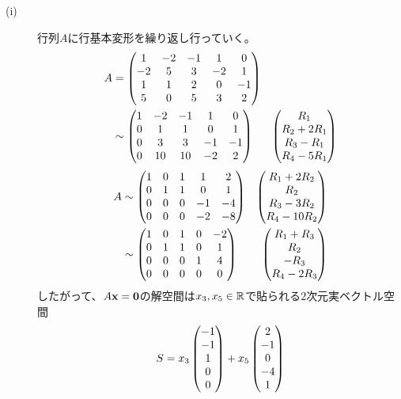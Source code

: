 \begin{sol} ${}$
  \begin{description}
    \item[(i)] 行列$A$に行基本変形を繰り返し行っていく。
    \begin{align*}
      A &= \begin{pmatrix} 
      1 & -2 & -1 & 1 & 0 \\
      -2 & 5 & 3 & -2 & 1 \\
      1& 1& 2 &0 &-1 \\
      5&  0&  5&  3&  2 \\
       \end{pmatrix} \\
      &\sim \begin{pmatrix} 
      1 & -2 & -1 & 1 & 0 \\
      0 & 1 & 1 & 0 & 1 \\
      0& 3& 3 &-1 &-1 \\
      0&  10&  10&  -2&  2 \\
       \end{pmatrix} & \begin{pmatrix}  R_1 \\ R_2+2R_1 \\ R_3-R_1 \\ R_4-5R_1 \end{pmatrix}
    \end{align*}
    \begin{align*}
    A  &\sim \begin{pmatrix} 
      1 & 0 & 1 & 1 & 2 \\
      0 & 1 & 1 & 0 & 1 \\
      0& 0& 0 &-1 &-4 \\
      0&  0&  0&  -2&  -8 \\
       \end{pmatrix} & \begin{pmatrix}  R_1+2R_2 \\ R_2 \\ R_3-3R_2  \\ R_4 -10R_2 \end{pmatrix} \\
      &\sim \begin{pmatrix} 
        1 & 0 & 1 & 0 & -2 \\
        0 & 1 & 1 & 0 & 1 \\
        0& 0& 0 &1 &4 \\
        0&  0&  0&  0&  0 \\
         \end{pmatrix} & \begin{pmatrix} R_1+R_3 \\ R_2 \\ -R_3 \\ R_4-2R_3  \end{pmatrix}
    \end{align*}
    したがって、$A\textbf{x}=\textbf{0}$の解空間は$x_3,x_5 \in {\mathbb R}$で貼られる$2$次元実ベクトル空間
    \[
    S = x_3 \begin{pmatrix} -1 \\-1 \\1 \\0 \\0  \end{pmatrix} + x_5 \begin{pmatrix} 2\\ -1\\ 0\\ -4\\ 1 \end{pmatrix}
\]
\end{description}
\end{sol}
